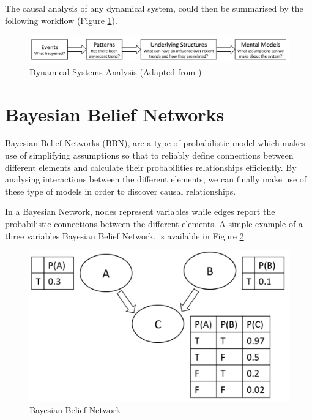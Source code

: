 The causal analysis of any dynamical system, could then be summarised by the following workflow (Figure \ref{wow2}). 

\begin{figure}[ht!]%
    \centering
    \includegraphics[width=1\linewidth]{latex/images/discover.pdf}
    \vspace{-0.6cm}
    \caption{Dynamical Systems Analysis (Adapted from \cite{system})}
    \label{wow2}
\end{figure}
\vspace{-0.5cm}

\section{Bayesian Belief Networks}

Bayesian Belief Networks (BBN), are a type of probabilistic model which makes use of simplifying assumptions so that to reliably define connections between different elements and calculate their probabilities relationships efficiently. By analysing interactions between the different elements, we can finally make use of these type of models in order to discover causal relationships. 

In a Bayesian Network, nodes represent variables while edges report the probabilistic connections between the different elements. A simple example of a three variables Bayesian Belief Network, is available in Figure \ref{net}. 

\vspace{-0.5cm}
\begin{figure}[ht!]%
    \centering
    \includegraphics[width=0.7\linewidth]{latex/images/bayes.pdf}
    \vspace{-0.2cm}
    \caption{Bayesian Belief Network}
    \label{net}
\end{figure}
\vspace{-0.7cm}

